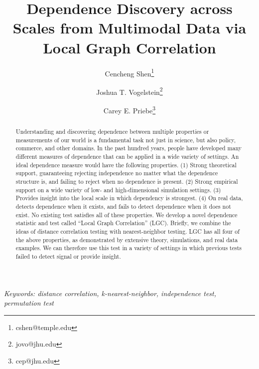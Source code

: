 \documentclass[11pt]{article}
\begin{document}
\def\spacingset#1{\renewcommand{\baselinestretch}%
{#1}\small\normalsize} \spacingset{1}

\title{\bf Dependence Discovery across Scales from Multimodal Data via Local Graph Correlation}
\author[1]{Cencheng Shen\thanks{cshen@temple.edu}}
\author[2]{Joshua T. Vogelstein\thanks{jovo@jhu.edu}}
\author[3]{Carey E. Priebe\thanks{cep@jhu.edu}}
\maketitle
\pagestyle{empty}

\bigskip
\begin{abstract}
Understanding and discovering dependence between multiple properties or measurements of our world is a fundamental task not just in science, but also policy, commerce, and other domains. In the past hundred years, people have developed many different measures of dependence that can be applied in a wide variety of settings.  An ideal dependence measure would have the following properties. (1) Strong theoretical support, guaranteeing rejecting independence no matter what the dependence structure is, and failing to reject when no dependence is present. (2) Strong empirical support on a wide variety of low- and high-dimensional simulation settings. (3) Provides insight into the local scale in which dependency is strongest. (4) On real data, detects dependence when it exists, and fails to detect dependence when it does not exist. No existing test satisfies all of these properties. We develop a novel dependence statistic and test called ``Local Graph Correlation'' (LGC).  Briefly, we combine the ideas of distance correlation testing with nearest-neighbor testing.  LGC has all four of the above properties, as demonstrated by extensive theory, simulations, and real data examples. We can therefore use this test in a variety of settings in which previous tests failed to detect signal or provide insight.
\end{abstract}

\noindent%
{\it Keywords: distance correlation, k-nearest-neighbor, independence test, permutation test}  
\vfill

\clearpage
\tableofcontents


\newpage
\spacingset{1.45}
\end{document}
